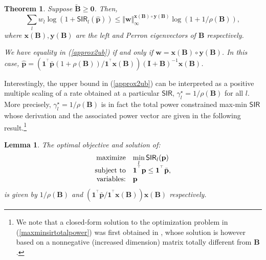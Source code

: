 \documentclass[10pt,twocolumn]{IEEEtran}
\newcommand{\0}{\mathbf{0}}
\newcommand{\1}{\mathbf{1}}
\newcommand{\trans}{^\top}
\newtheorem{theorem}{Theorem}
\newtheorem{lemma}{Lemma}
\begin{document}
\begin{theorem}
\label{approx2ubtheorem}
Suppose $\mathbf{\tilde{B}} \ge \mathbf{0}$. Then, 
%
\begin{equation}
\label{approx2ub}
\sum_l w_l \log(1+\mathsf{SIR}_l(\mathbf{\widehat{p}})) \le \Vert \mathbf{w} \Vert^{\mathbf{x}(\mathbf{B}) \circ \mathbf{y}(\mathbf{B})}_{\infty} \log \left( 1 + 1/\rho(\mathbf{B}) \right),
\end{equation}
where $\mathbf{x}(\mathbf{B}),\mathbf{y}(\mathbf{B})$ are the left and Perron eigenvectors of $\mathbf{B}$ respectively. 

We have equality in (\ref{approx2ub}) if and only if $\mathbf{w}=\mathbf{x}(\mathbf{B}) \circ \mathbf{y}(\mathbf{B})$. In this case, $\mathbf{\widehat{p}}=(\mathbf{1}^{\trans} \bar{\mathbf{p}}(1+\rho(\mathbf{B}))/\mathbf{1}^{\trans} \mathbf{x}(\mathbf{B}))(\mathbf{I}+\mathbf{B})^{-1} \mathbf{x}(\mathbf{B})$.
\end{theorem}

Interestingly, the upper bound in (\ref{approx2ub}) can be interpreted as a positive multiple scaling of a rate obtained at a particular $\mathsf{SIR}$, $\gamma^{\star}_l=1/\rho(\mathbf{B})$ for all $l$. More precisely, $\gamma^{\star}_l=1/\rho(\mathbf{B})$ is in fact the total power constrained max-min $\mathsf{SIR}$ whose derivation and the associated power vector are given in the following result.\footnote{We note that a closed-form solution to the optimization problem in (\ref{maxminsirtotalpower}) was first obtained in \cite{Yang98}, whose solution is however based on a nonnegative (increased dimension) matrix totally different from $\mathbf{B}$.}
\begin{lemma}
\label{maxminsirtotalpowerlemma}
The optimal objective and solution of:
\begin{equation}
\label{maxminsirtotalpower}
\begin{array}
[c]{rl}
\mbox{maximize} & \displaystyle \min_l \mathsf{SIR}_l(\mathbf{p}) \\
\mbox{subject to} & \mathbf{1}^{\trans} \mathbf{p} \le \mathbf{1}^{\trans} \bar{\mathbf{p}}, \\
\mbox{variables:} & \mathbf{p}
\end{array}
\end{equation}
is given by $1/\rho(\mathbf{B})$ and $(\mathbf{1}^{\trans} \bar{\mathbf{p}}/\mathbf{1}^{\trans} \mathbf{x}(\mathbf{B})) \mathbf{x}(\mathbf{B})$ respectively.
\end{lemma}
\end{document}
